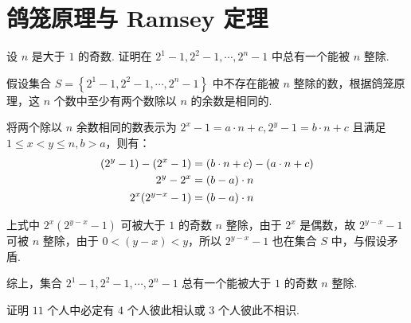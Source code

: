 \documentclass[cn, hazy, blue, normal, 12pt]{elegantnote}
\begin{document}
\section{鸽笼原理与 Ramsey 定理}

\begin{exercise}

    设 $n$ 是大于 $1$ 的奇数. 证明在 $2^1-1, 2^2-1, \cdots, 2^n-1$ 中总有一个能被 $n$ 整除.

\end{exercise}

\begin{solution}[print=true]

    假设集合 $S = \left\{ 2^1-1, 2^2-1, \cdots, 2^n-1 \right\}$ 中不存在能被 $n$ 整除的数，根据鸽笼原理，这 $n$ 个数中至少有两个数除以 $n$ 的余数是相同的.

    将两个除以 $n$ 余数相同的数表示为 $2^x-1=a \cdot n+c, 2^y-1=b \cdot n+c$ 且满足 $1 \leq x < y \leq n, b > a$，则有：
    \begin{equation}
        \notag
        \begin{aligned}
            (2^y-1) - (2^x-1) & = (b \cdot n+c) - (a \cdot n+c) \\
            2^y - 2^x         & = (b-a) \cdot n                 \\
            2^x(2^{y-x}-1)    & = (b-a) \cdot n
        \end{aligned}
    \end{equation}

    上式中 $2^x(2^{y-x}-1)$ 可被大于 $1$ 的奇数 $n$ 整除，由于 $2^x$ 是偶数，故 $2^{y-x}-1$ 可被 $n$ 整除，由于 $ 0 < (y-x) < y$，所以 $2^{y-x}-1$ 也在集合 $S$ 中，与假设矛盾.

    综上，集合 $2^1-1, 2^2-1, \cdots, 2^n-1$ 总有一个能被大于 $1$ 的奇数 $n$ 整除.

\end{solution}

\begin{exercise}

    证明 $11$ 个人中必定有 $4$ 个人彼此相认或 $3$ 个人彼此不相识.

\end{exercise}
\end{document}
